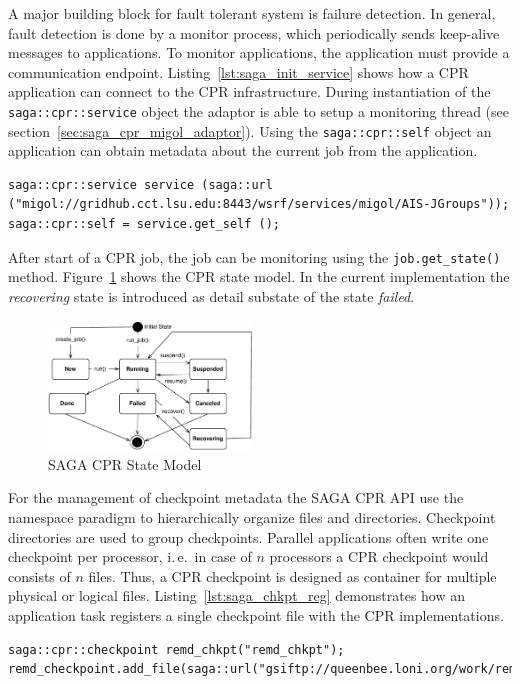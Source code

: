 \documentclass[times, 10pt,twocolumn]{article}
\begin{document}
A major building block for fault tolerant system is failure detection. In general, fault detection is done by a monitor process, 
which periodically sends keep-alive messages to applications. To monitor applications, the application must provide a communication endpoint.
Listing~\ref{lst:saga_init_service} shows how a CPR application can connect to the CPR infrastructure. During instantiation of the \texttt{saga::cpr::service} object the adaptor is able to setup a monitoring thread (see section~\ref{sec:saga_cpr_migol_adaptor}). Using the \texttt{saga::cpr::self} object an application can obtain metadata about the current job from the application.                                                                               
\begin{lstlisting}[style=myListing, caption={SAGA CPR: Initialize Migol Session}, label={lst:saga_init_service}]
saga::cpr::service service (saga::url ("migol://gridhub.cct.lsu.edu:8443/wsrf/services/migol/AIS-JGroups"));
saga::cpr::self = service.get_self ();
\end{lstlisting}
      
After start of a CPR job, the job can be monitoring using the \texttt{job.get\_state()} method. Figure~\ref{fig:cpr-statemodel} shows the CPR state model. In the current implementation the \emph{recovering} state is introduced as detail substate of the state \emph{failed}.
\begin{figure}[th]
    \centering
        \includegraphics[width=0.48\textwidth]{cpr-statemodel.pdf}
    \caption{SAGA CPR State Model}
    \label{fig:cpr-statemodel}
\end{figure}
                               

For the management of checkpoint metadata the SAGA CPR API use the namespace paradigm to hierarchically 
organize files and directories. Checkpoint directories are 
used to group checkpoints. Parallel applications often write one checkpoint per 
processor, i.\,e.\ in case of $n$ processors a CPR checkpoint
would consists of $n$ files. Thus, a CPR checkpoint is designed as container 
for multiple physical or logical files. Listing~\ref{lst:saga_chkpt_reg} demonstrates how an application task registers a single checkpoint file with the CPR implementations.     
\begin{lstlisting}[style=myListing, caption={SAGA CPR: Register Checkpoint with Migol}, label={lst:saga_chkpt_reg}]
saga::cpr::checkpoint remd_chkpt("remd_chkpt");
remd_checkpoint.add_file(saga::url("gsiftp://queenbee.loni.org/work/remd/remd_chkpt.dat"));
\end{lstlisting}
\end{document}
